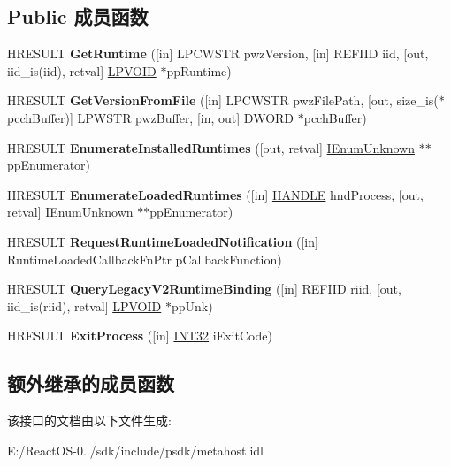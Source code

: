 \subsection*{Public 成员函数}
\begin{DoxyCompactItemize}
\item 
\mbox{\label{interface_i_c_l_r_meta_host_a93f2c6933787631495cbd3a5fde8685d}} 
H\+R\+E\+S\+U\+LT {\bfseries Get\+Runtime} (\mbox{[}in\mbox{]} L\+P\+C\+W\+S\+TR pwz\+Version, \mbox{[}in\mbox{]} R\+E\+F\+I\+ID iid, \mbox{[}out, iid\+\_\+is(iid), retval\mbox{]} \hyperlink{interfacevoid}{L\+P\+V\+O\+ID} $\ast$pp\+Runtime)
\item 
\mbox{\label{interface_i_c_l_r_meta_host_aef1a66e45e8069b3b57a14e44cabe990}} 
H\+R\+E\+S\+U\+LT {\bfseries Get\+Version\+From\+File} (\mbox{[}in\mbox{]} L\+P\+C\+W\+S\+TR pwz\+File\+Path, \mbox{[}out, size\+\_\+is($\ast$pcch\+Buffer)\mbox{]} L\+P\+W\+S\+TR pwz\+Buffer, \mbox{[}in, out\mbox{]} D\+W\+O\+RD $\ast$pcch\+Buffer)
\item 
\mbox{\label{interface_i_c_l_r_meta_host_af84a0f762bd3a4cd1d72a186a8d3a377}} 
H\+R\+E\+S\+U\+LT {\bfseries Enumerate\+Installed\+Runtimes} (\mbox{[}out, retval\mbox{]} \hyperlink{interface_i_enum_unknown}{I\+Enum\+Unknown} $\ast$$\ast$pp\+Enumerator)
\item 
\mbox{\label{interface_i_c_l_r_meta_host_aceedcaefd06e05d05e25149954c4fe7a}} 
H\+R\+E\+S\+U\+LT {\bfseries Enumerate\+Loaded\+Runtimes} (\mbox{[}in\mbox{]} \hyperlink{interfacevoid}{H\+A\+N\+D\+LE} hnd\+Process, \mbox{[}out, retval\mbox{]} \hyperlink{interface_i_enum_unknown}{I\+Enum\+Unknown} $\ast$$\ast$pp\+Enumerator)
\item 
\mbox{\label{interface_i_c_l_r_meta_host_a71857ccb0a30946957b8ae23ffbbc5a6}} 
H\+R\+E\+S\+U\+LT {\bfseries Request\+Runtime\+Loaded\+Notification} (\mbox{[}in\mbox{]} Runtime\+Loaded\+Callback\+Fn\+Ptr p\+Callback\+Function)
\item 
\mbox{\label{interface_i_c_l_r_meta_host_afb078cc83cc673827569ad58b04713c5}} 
H\+R\+E\+S\+U\+LT {\bfseries Query\+Legacy\+V2\+Runtime\+Binding} (\mbox{[}in\mbox{]} R\+E\+F\+I\+ID riid, \mbox{[}out, iid\+\_\+is(riid), retval\mbox{]} \hyperlink{interfacevoid}{L\+P\+V\+O\+ID} $\ast$pp\+Unk)
\item 
\mbox{\label{interface_i_c_l_r_meta_host_ac5e8a110997fc56d8f5400c0d4a4b0ae}} 
H\+R\+E\+S\+U\+LT {\bfseries Exit\+Process} (\mbox{[}in\mbox{]} \hyperlink{_processor_bind_8h_a1137216524060afd426c34677fed058b}{I\+N\+T32} i\+Exit\+Code)
\end{DoxyCompactItemize}
\subsection*{额外继承的成员函数}


该接口的文档由以下文件生成\+:\begin{DoxyCompactItemize}
\item 
E\+:/\+React\+O\+S-\/0../sdk/include/psdk/metahost.\+idl\end{DoxyCompactItemize}
